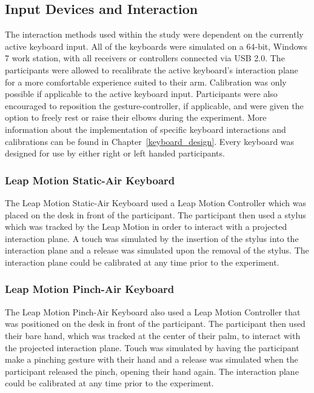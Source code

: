 \subsection{Input Devices and Interaction}
The interaction methods used within the study were dependent on the currently active keyboard input. All of the keyboards were simulated on a 64-bit, Windows 7 work station, with all receivers or controllers connected via USB 2.0. The participants were allowed to recalibrate the active keyboard's interaction plane for a more comfortable experience suited to their arm. Calibration was only possible if applicable to the active keyboard input. Participants were also encouraged to reposition the gesture-controller, if applicable, and were given the option to freely rest or raise their elbows during the experiment. More information about the implementation of specific keyboard interactions and calibrations can be found in Chapter~\ref{keyboard_design}. Every keyboard was designed for use by either right or left handed participants.

\subsubsection{Leap Motion Static-Air Keyboard}
The Leap Motion Static-Air Keyboard used a Leap Motion Controller which was placed on the desk in front of the participant. The participant then used a stylus which was tracked by the Leap Motion in order to interact with a projected interaction plane. A touch was simulated by the insertion of the stylus into the interaction plane and a release was simulated upon the removal of the stylus. The interaction plane could be calibrated at any time prior to the experiment.

\subsubsection{Leap Motion Pinch-Air Keyboard}
The Leap Motion Pinch-Air Keyboard also used a Leap Motion Controller that was positioned on the desk in front of the participant. The participant then used their bare hand, which was tracked at the center of their palm, to interact with the projected interaction plane. Touch was simulated by having the participant make a pinching gesture with their hand and a release was simulated when the participant released the pinch, opening their hand again. The interaction plane could be calibrated at any time prior to the experiment.

